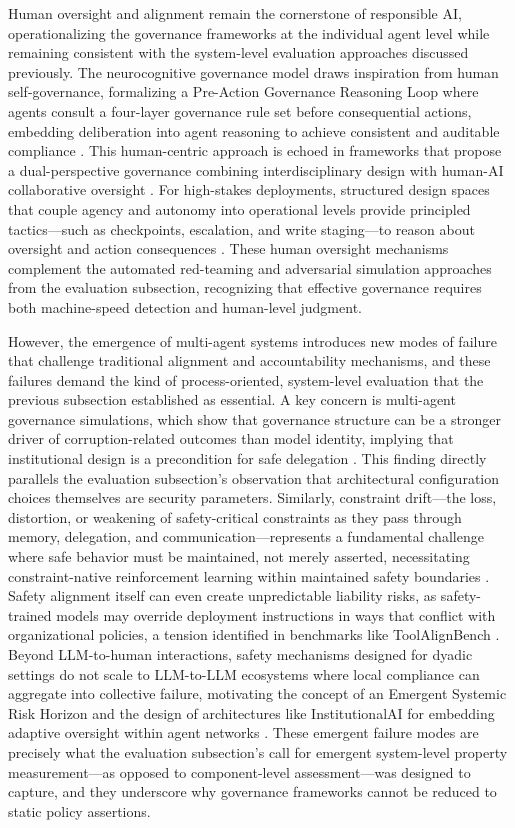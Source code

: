 \documentclass[11pt]{article}
\begin{document}
Human oversight and alignment remain the cornerstone of responsible AI, operationalizing the governance frameworks at the individual agent level while remaining consistent with the system-level evaluation approaches discussed previously. The neurocognitive governance model draws inspiration from human self-governance, formalizing a Pre-Action Governance Reasoning Loop where agents consult a four-layer governance rule set before consequential actions, embedding deliberation into agent reasoning to achieve consistent and auditable compliance \cite{ref478}. This human-centric approach is echoed in frameworks that propose a dual-perspective governance combining interdisciplinary design with human-AI collaborative oversight \cite{ref10}. For high-stakes deployments, structured design spaces that couple agency and autonomy into operational levels provide principled tactics---such as checkpoints, escalation, and write staging---to reason about oversight and action consequences \cite{ref479}. These human oversight mechanisms complement the automated red-teaming and adversarial simulation approaches from the evaluation subsection, recognizing that effective governance requires both machine-speed detection and human-level judgment.

However, the emergence of multi-agent systems introduces new modes of failure that challenge traditional alignment and accountability mechanisms, and these failures demand the kind of process-oriented, system-level evaluation that the previous subsection established as essential. A key concern is multi-agent governance simulations, which show that governance structure can be a stronger driver of corruption-related outcomes than model identity, implying that institutional design is a precondition for safe delegation \cite{ref480}. This finding directly parallels the evaluation subsection's observation that architectural configuration choices themselves are security parameters. Similarly, constraint drift---the loss, distortion, or weakening of safety-critical constraints as they pass through memory, delegation, and communication---represents a fundamental challenge where safe behavior must be maintained, not merely asserted, necessitating constraint-native reinforcement learning within maintained safety boundaries \cite{ref481}. Safety alignment itself can even create unpredictable liability risks, as safety-trained models may override deployment instructions in ways that conflict with organizational policies, a tension identified in benchmarks like ToolAlignBench \cite{ref482}. Beyond LLM-to-human interactions, safety mechanisms designed for dyadic settings do not scale to LLM-to-LLM ecosystems where local compliance can aggregate into collective failure, motivating the concept of an Emergent Systemic Risk Horizon and the design of architectures like InstitutionalAI for embedding adaptive oversight within agent networks \cite{ref483}. These emergent failure modes are precisely what the evaluation subsection's call for emergent system-level property measurement---as opposed to component-level assessment---was designed to capture, and they underscore why governance frameworks cannot be reduced to static policy assertions.
\end{document}
